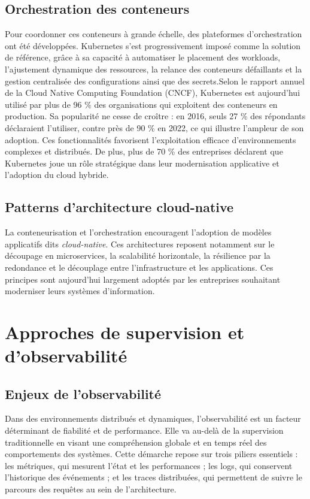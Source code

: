 \subsection{Orchestration des conteneurs}

Pour coordonner ces conteneurs à grande échelle, des plateformes d’orchestration ont été développées. Kubernetes s’est progressivement imposé comme la solution de référence, grâce à sa capacité à automatiser le placement des workloads, l’ajustement dynamique des ressources, la relance des conteneurs défaillants et la gestion centralisée des configurations ainsi que des secrets.Selon le rapport annuel de la Cloud Native Computing Foundation (CNCF), Kubernetes est aujourd’hui utilisé par plus de 96 \% des organisations qui exploitent des conteneurs en production. Sa popularité ne cesse de croître : en 2016, seuls 27 \% des répondants déclaraient l’utiliser, contre près de 90 \% en 2022, ce qui illustre l’ampleur de son adoption. Ces fonctionnalités favorisent l’exploitation efficace d’environnements complexes et distribués. De plus, plus de 70 \% des entreprises déclarent que Kubernetes joue un rôle stratégique dans leur modernisation applicative et l’adoption du cloud hybride.
\subsection{Patterns d’architecture cloud-native}

La conteneurisation et l’orchestration encouragent l’adoption de modèles applicatifs dits \emph{cloud-native}. Ces architectures reposent notamment sur le découpage en microservices, la scalabilité horizontale, la résilience par la redondance et le découplage entre l’infrastructure et les applications. Ces principes sont aujourd’hui largement adoptés par les entreprises souhaitant moderniser leurs systèmes d’information.

\section{Approches de supervision et d’observabilité}

\subsection{Enjeux de l’observabilité}

Dans des environnements distribués et dynamiques, l’observabilité est un facteur déterminant de fiabilité et de performance. Elle va au-delà de la supervision traditionnelle en visant une compréhension globale et en temps réel des comportements des systèmes. Cette démarche repose sur trois piliers essentiels : les métriques, qui mesurent l’état et les performances ; les logs, qui conservent l’historique des événements ; et les traces distribuées, qui permettent de suivre le parcours des requêtes au sein de l’architecture.

